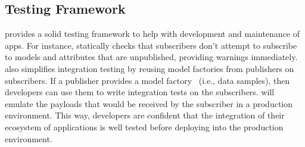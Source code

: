 \subsection{Testing Framework}
\label{sec:testing}

\synapse provides a solid testing framework to help with development and
maintenance of apps.  For instance, \synapse statically checks that subscribers
don't attempt to subscribe to models and attributes that are unpublished,
providing warnings immediately. \synapse also simplifies integration testing by
reusing model factories from publishers on subscribers.  If a publisher
provides a model factory~\cite{factory-girl} (i.e., data samples), then
developers can use them to write integration tests on the subscribers.
\synapse will emulate the payloads that would be received by the subscriber in a
production environment. This way, developers are confident that the integration
of their ecosystem of applications is well tested before deploying into the
production environment.


\begin{table}[t]
 \caption{{\bf Support for Various DBs.}
 Shows ORM- and DB-specific lines of code (LoC) to support varied DBs.
 For ORMs supporting many DBs (e.g., ActiveRecord), adding a new DB comes for free.}
 \label{tab:db-heterogeneity}
\end{table}

